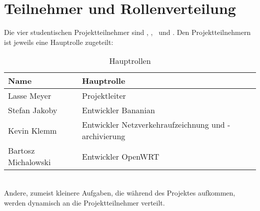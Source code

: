 \section{Teilnehmer und Rollenverteilung}
Die vier studentischen Projektteilnehmer sind \docJakoby, \docKlemm, \docMeyer~und \docMichalowski. Den Projektteilnehmern ist jeweils eine Hauptrolle zugeteilt:
\begin{table}[h]
\caption{Hauptrollen}
\begin{tabular}{l|l}
\textbf{Name} & \textbf{Hauptrolle} \\
\hline
Lasse Meyer & Projektleiter \\
Stefan Jakoby & Entwickler Bananian \\
Kevin Klemm & Entwickler Netzverkehraufzeichnung und -archivierung \\
Bartosz Michalowski & Entwickler OpenWRT \\
\end{tabular}
\label{table:rollen}
\end{table}
\\[1ex]
Andere, zumeist kleinere Aufgaben, die während des Projektes aufkommen, werden dynamisch an die Projektteilnehmer verteilt.
